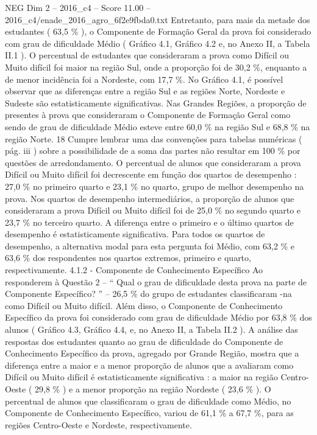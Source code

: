 \begin{textsample}{NEG Dim 2 – 2016\_c4 – Score 11.00 – 2016\_c4/enade\_2016\_agro\_6f2e9fbda0.txt}
Entretanto, para mais da metade dos estudantes ( 63,5 \% ), o Componente de Formação Geral da prova foi considerado com grau de dificuldade Médio ( Gráfico 4.1, Gráfico 4.2 e, no Anexo II, a Tabela II.1 ).
O percentual de estudantes que consideraram a prova como Difícil ou Muito difícil foi maior na região Sul, onde a proporção foi de 30,2 \%, enquanto a de menor incidência foi a Nordeste, com 17,7 \%.
No Gráfico 4.1, é possível observar que as diferenças entre a região Sul e as regiões Norte, Nordeste e Sudeste são estatisticamente significativas.
Nas Grandes Regiões, a proporção de presentes à prova que consideraram o Componente de Formação Geral como sendo de grau de dificuldade Médio esteve entre 60,0 \% na região Sul e 68,8 \% na região Norte. 18 Cumpre lembrar uma das convenções para tabelas numéricas ( pág. iii ) sobre a possibilidade de a soma das partes não resultar em 100 \% por questões de arredondamento.
O percentual de alunos que consideraram a prova Difícil ou Muito difícil foi decrescente em função dos quartos de desempenho : 27,0 \% no primeiro quarto e 23,1 \% no quarto, grupo de melhor desempenho na prova.
Nos quartos de desempenho intermediários, a proporção de alunos que consideraram a prova Difícil ou Muito difícil foi de 25,0 \% no segundo quarto e 23,7 \% no terceiro quarto.
A diferença entre o primeiro e o último quartos de desempenho é estatisticamente significativa.
Para todos os quartos de desempenho, a alternativa modal para esta pergunta foi Médio, com 63,2 \% e 63,6 \% dos respondentes nos quartos extremos, primeiro e quarto, respectivamente. 4.1.2 - Componente de Conhecimento Específico Ao responderem à Questão 2 – “ Qual o grau de dificuldade desta prova na parte de Componente Específico? ” – 26,5 \% do grupo de estudantes classificaram -na como Difícil ou Muito difícil.
Além disso, o Componente de Conhecimento Específico da prova foi considerado com grau de dificuldade Médio por 63,8 \% dos alunos ( Gráfico 4.3, Gráfico 4.4, e, no Anexo II, a Tabela II.2 ).
A análise das respostas dos estudantes quanto ao grau de dificuldade do Componente de Conhecimento Específico da prova, agregado por Grande Região, mostra que a diferença entre a maior e a menor proporção de alunos que a avaliaram como Difícil ou Muito difícil é estatisticamente significativa : a maior na região Centro-Oeste ( 29,8 \% ) e a menor proporção na região Nordeste ( 23,6 \% ).
O percentual de alunos que classificaram o grau de dificuldade como Médio, no Componente de Conhecimento Específico, variou de 61,1 \% a 67,7 \%, para as regiões Centro-Oeste e Nordeste, respectivamente.

\end{textsample}
